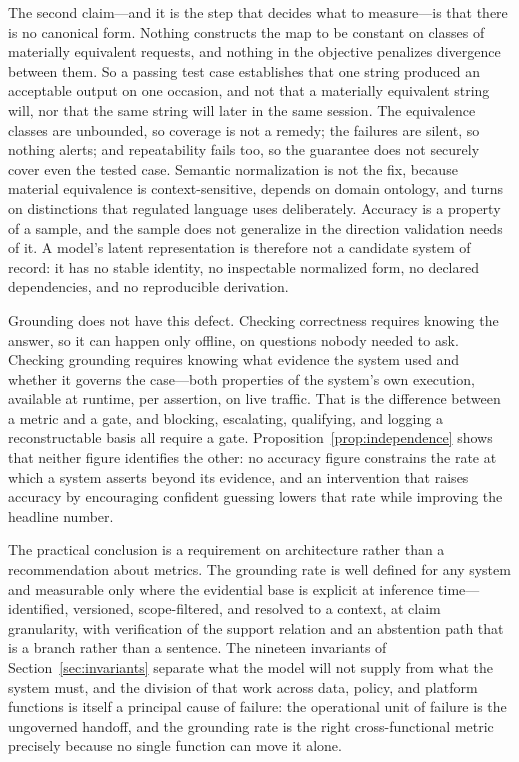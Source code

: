 The second claim---and it is the step that decides what to measure---is that there
is no canonical form. Nothing constructs the map to be constant on classes of materially equivalent
requests, and nothing in the objective penalizes divergence between them. So a
passing test case establishes that one string produced an acceptable output on one
occasion, and not that a materially equivalent string will, nor that the same string
will later in the same session. The equivalence classes are unbounded, so coverage
is not a remedy; the failures are silent, so nothing alerts; and repeatability fails
too, so the guarantee does not securely cover even the tested case. Semantic
normalization is not the fix, because material equivalence is context-sensitive,
depends on domain ontology, and turns on distinctions that regulated language uses
deliberately. Accuracy is a property of a sample, and the sample does not generalize
in the direction validation needs of it. A model's latent representation is
therefore not a candidate system of record: it has no stable identity, no
inspectable normalized form, no declared dependencies, and no reproducible
derivation.

Grounding does not have this defect. Checking correctness requires knowing
the answer, so it can happen only offline, on questions nobody needed to ask.
Checking grounding requires knowing what evidence the system used and whether it
governs the case---both properties of the system's own execution, available at
runtime, per assertion, on live traffic. That is the difference between a metric and
a gate, and blocking, escalating, qualifying, and logging a reconstructable basis all
require a gate. Proposition~\ref{prop:independence} shows that neither figure identifies the other: no accuracy figure constrains the rate at which a
system asserts beyond its evidence, and an intervention that raises accuracy by
encouraging confident guessing lowers that rate while improving the headline number.

The practical conclusion is a requirement on architecture rather than a
recommendation about metrics. The grounding rate is well defined for any system and
measurable only where the evidential base is explicit at inference
time---identified, versioned, scope-filtered, and resolved to a context, at claim
granularity, with verification of the support relation and an abstention path that
is a branch rather than a sentence. The nineteen invariants of
Section~\ref{sec:invariants} separate what the model will not supply from what the
system must, and the division of that work across data, policy, and platform
functions is itself a principal cause of failure: the operational unit of failure is
the ungoverned handoff, and the grounding rate is the right cross-functional metric
precisely because no single function can move it alone.

